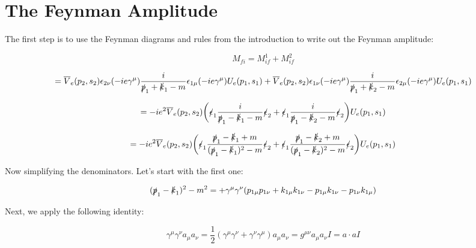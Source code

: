\documentclass[a4]{article}
\begin{document}
    \section*{The Feynman Amplitude}

    The first step is to use the Feynman diagrams and rules from the introduction to write out the Feynman amplitude:

    \begin{equation}
        M_{fi} = M_{if}^1 + M_{if}^2 
    \end{equation}

    \begin{equation}
            = \overline{V}_e (p_2, s_2) \epsilon_{2 \nu} (- i e \gamma^{\mu}) \frac{i}{\slashed{p}_1 + \slashed{k}_1 - m} \epsilon_{1 \mu} (- i e \gamma^{\mu}) U_e (p_1, s_1)
            + \overline{V}_e (p_2, s_2) \epsilon_{1 \nu} (- i e \gamma^{\mu}) \frac{i}{\slashed{p}_1 + \slashed{k}_2 - m} \epsilon_{2 \mu} (- i e \gamma^{\mu}) U_e (p_1, s_1)
    \end{equation}

    \begin{equation}
        = -i e^2 \overline{V}_e (p_2, s_2) \bigg( \slashed{\epsilon}_1 \frac{i}{\slashed{p}_1 - \slashed{k}_1 - m} \slashed{\epsilon}_2 + \slashed{\epsilon}_1 \frac{i}{\slashed{p}_1 - \slashed{k}_2 - m} \slashed{\epsilon}_2 \bigg) U_e (p_1, s_1)
    \end{equation}

    \begin{equation}
        = -i e^2 \overline{V}_e (p_2, s_2) \bigg( \slashed{\epsilon}_1 \frac{\slashed{p}_1 - \slashed{k}_1 + m}{(\slashed{p}_1 - \slashed{k}_1)^2 - m} \slashed{\epsilon}_2 + \slashed{\epsilon}_1 \frac{\slashed{p}_1 - \slashed{k}_2 + m}{(\slashed{p}_1 - \slashed{k}_2)^2 - m} \slashed{\epsilon}_2 \bigg) U_e (p_1, s_1)
    \end{equation}

    Now simplifying the denominators. Let's start with the first one:

    \begin{equation}
        (\slashed{p}_1 - \slashed{k}_1)^2 - m^2 = + \gamma^\mu \gamma^\nu (p_{1 \mu} p_{1 \nu} + k_{1 \mu} k_{1 \nu} - p_{1 \mu} k_{1 \nu} - p_{1 \nu} k_{1 \mu})
    \end{equation}

    Next, we apply the following identity:

    \begin{equation}
        \gamma^\mu \gamma^\nu a_\mu a_\nu = \frac{1}{2} (\gamma^\mu \gamma^\nu + \gamma^\nu \gamma^\mu) a_\mu a_\nu = g^{\mu \nu} a_{\mu} a_{\nu} I = a \cdot a I
    \end{equation}
\end{document}

